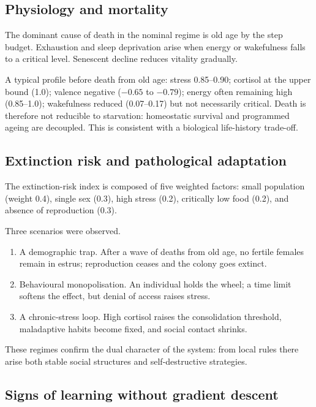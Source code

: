 \documentclass[11pt,a4paper]{article}
\begin{document}
\subsection{Physiology and mortality}

The dominant cause of death in the nominal regime is old age by the step budget. Exhaustion and sleep deprivation arise when energy or wakefulness falls to a critical level. Senescent decline reduces vitality gradually.

A typical profile before death from old age: stress 0.85--0.90; cortisol at the upper bound (1.0); valence negative (\(-0.65\) to \(-0.79\)); energy often remaining high (0.85--1.0); wakefulness reduced (0.07--0.17) but not necessarily critical. Death is therefore not reducible to starvation: homeostatic survival and programmed ageing are decoupled. This is consistent with a biological life-history trade-off.

\subsection{Extinction risk and pathological adaptation}

The extinction-risk index is composed of five weighted factors: small population (weight 0.4), single sex (0.3), high stress (0.2), critically low food (0.2), and absence of reproduction (0.3).

Three scenarios were observed.
\begin{enumerate}
\item A demographic trap. After a wave of deaths from old age, no fertile females remain in estrus; reproduction ceases and the colony goes extinct.
\item Behavioural monopolisation. An individual holds the wheel; a time limit softens the effect, but denial of access raises stress.
\item A chronic-stress loop. High cortisol raises the consolidation threshold, maladaptive habits become fixed, and social contact shrinks.
\end{enumerate}

These regimes confirm the dual character of the system: from local rules there arise both stable social structures and self-destructive strategies.

\subsection{Signs of learning without gradient descent}
\end{document}

